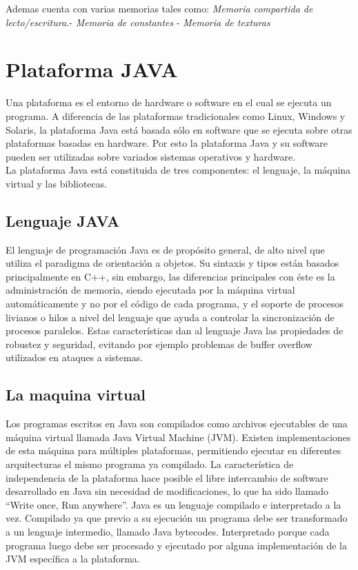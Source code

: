 Ademas cuenta con varias memorias tales como: \textit{Memoria compartida de lecto/escritura.}- \textit{Memoria de constantes} - \textit{Memoria de texturas}   


\section{Plataforma JAVA}

Una plataforma es el entorno de hardware o software en el cual se ejecuta un programa. A diferencia de las plataformas tradicionales como Linux, Windows y Solaris, la plataforma Java está basada sólo en software que se ejecuta sobre otras plataformas basadas en hardware. Por esto la plataforma Java y su software pueden ser utilizadas sobre variados sistemas operativos y hardware. 
\\La plataforma Java está constituida de tres componentes: el lenguaje, la máquina virtual
y las bibliotecas. \cite[pág. 5]{nunez2003investigacion}

\subsection{Lenguaje JAVA}

El lenguaje de programación Java es de propósito general, de alto nivel que utiliza el paradigma de orientación a objetos. Su sintaxis y tipos están basados principalmente en C++, sin embargo, las diferencias principales con éste es la administración de memoria, siendo ejecutada por la máquina virtual automáticamente y no por el código de cada programa, y el soporte de procesos livianos o hilos a nivel del lenguaje que ayuda a controlar la sincronización de procesos paralelos. Estas características dan al lenguaje Java las propiedades de robustez y seguridad, evitando por ejemplo problemas de buffer overflow utilizados en ataques a sistemas. \cite[pág. 5]{nunez2003investigacion}

\subsection{La maquina virtual}

Los programas escritos en Java son compilados como archivos ejecutables de una máquina virtual llamada Java Virtual Machine (JVM). Existen implementaciones de esta máquina para múltiples plataformas, permitiendo ejecutar en diferentes arquitecturas el mismo programa ya compilado. La característica de independencia de la plataforma hace posible el libre intercambio de software desarrollado en Java sin necesidad de modificaciones, lo que ha sido llamado “Write once, Run anywhere”. \cite{deepak2001core}
Java es un lenguaje compilado e interpretado a la vez. Compilado ya que previo a su ejecución un programa debe ser transformado a un lenguaje intermedio, llamado Java bytecodes. Interpretado porque cada programa luego debe ser procesado y ejecutado por alguna implementación de la JVM específica a la plataforma. \cite[pág. 6]{nunez2003investigacion}

